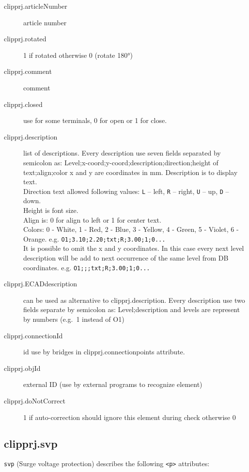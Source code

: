 \documentclass[%
	a4paper,
	oneside,
	listof=numbered,
	parskip=half,
	headsepline=true,
	footsepline=false,
	normalheadings,
	0.7headlines,
	headexclude,
	]{scrbook}
\begin{document}
\begin{description}
	\item[clipprj.articleNumber] article number 
	\item[clipprj.rotated] 1 if rotated otherwise 0 (rotate 180°) 
	\item[clipprj.comment] comment 
	\item[clipprj.closed] use for some terminals, 0 for open or 1 for close. 
	\item[clipprj.description] list of descriptions.
	Every description use seven fields separated by semicolon as: Level;x-coord;y-coord;description;direction;height of text;align;color x and y are coordinates in mm.
	Description is to display text.\\
	Direction text allowed following values: 
	\verb|L| – left, \verb|R| – right, \verb|U| – up, \verb|D| – down.\\
	Height is font size.\\
	Align is: 0 for align to left or 1 for center text.\\
	Colors: 0 - White, 1 - Red, 2 - Blue, 3 - Yellow, 4 - Green, 5 - Violet, 6 - Orange.
	e.g. \verb|O1;3.10;2.20;txt;R;3.00;1;0...|\\
	It is possible to omit the x and y coordinates.
	In this case every next level description will be add to next occurrence of the same level from DB coordinates.
	e.g. \verb|O1;;;txt;R;3.00;1;0...|
	\item[clipprj.ECADdescription] can be used as alternative to clipprj.description.
	Every description use two fields separate by semicolon as: Level;description and levels are represent by numbers (e.g.\ 1 instead of O1)
	\item[clipprj.connectionId] id use by bridges in clipprj.connectionpoints attribute. 
	\item[clipprj.objId] external ID (use by external programs to recognize element) 
	\item[clipprj.doNotCorrect] 1 if auto-correction should ignore this element during check otherwise 0 
\end{description}

\subsection{clipprj.svp}
 
\verb|svp| (Surge voltage protection) describes the following \verb|<p>| attributes: 
\end{document}
